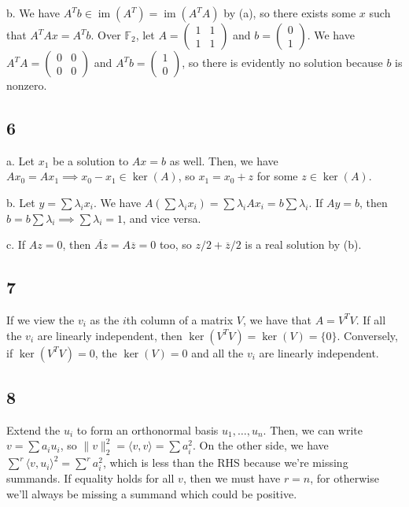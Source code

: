 \documentclass{article}
\newcommand{\conj}{\overline}
\newcommand{\openm}{\begin{pmatrix}}
\newcommand{\closem}{\end{pmatrix}}
\DeclareMathOperator{\im}{im}
\begin{document}
\noindent b. We have $A^Tb\in\im(A^T)=\im(A^TA)$ by (a), so there exists some $x$ such that $A^TAx=A^Tb$. Over $\mathbb{F}_2$, let $A=\openm1&1\\1&1\closem$ and $b=\openm0\\1\closem$. We have $A^TA=\openm0&0\\0&0\closem$ and $A^Tb=\openm1\\0\closem$, so there is evidently no solution because $b$ is nonzero.

\subsection*{6}
a. Let $x_1$ be a solution to $Ax=b$ as well. Then, we have $Ax_0=Ax_1\implies x_0-x_1\in\ker(A)$, so $x_1=x_0+z$ for some $z\in\ker(A)$.

\noindent b. Let $y=\sum\lambda_ix_i$. We have $A(\sum\lambda_ix_i)=\sum\lambda_iAx_i=b\sum\lambda_i$. If $Ay=b$, then $b=b\sum\lambda_i\implies\sum\lambda_i=1$, and vice versa.

\noindent c. If $Az=0$, then $\conj{Az}=A\conj{z}=0$ too, so $z/2+\conj{z}/2$ is a real solution by (b).

\subsection*{7}
If we view the $v_i$ as the $i$th column of a matrix $V$, we have that $A=V^TV$. If all the $v_i$ are linearly independent, then $\ker(V^TV)=\ker(V)=\{0\}$. Conversely, if $\ker(V^TV)=0$, the $\ker(V)=0$ and all the $v_i$ are linearly independent.

\subsection*{8}
Extend the $u_i$ to form an orthonormal basis $u_1,\ldots,u_n$. Then, we can write $v=\sum a_iu_i$, so $\lVert v\rVert_2^2=\langle v,v\rangle=\sum a_i^2$. On the other side, we have $\sum^r\langle v,u_i\rangle^2=\sum^ra_i^2$, which is less than the RHS because we're missing summands. If equality holds for all $v$, then we must have $r=n$, for otherwise we'll always be missing a summand which could be positive.
\end{document}
